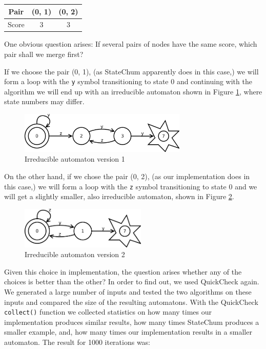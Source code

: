 \documentclass[]{sigplanconf}
\begin{document}
\begin{center}
\begin{tabular}{c||c|c}
Pair & (0, 1) & (0, 2)\\\hline\hline
Score & 3 & 3
\end{tabular}
\end{center}

One obvious question arises: If several pairs of nodes have the same score,
which pair shall we merge first?

If we choose the pair (0, 1), (as StateChum apparently does in this case,) we will
form a loop with the \texttt{y} symbol transitioning to state 0 and continuing with
the algorithm we will end up with an irreducible automaton shown in Figure \ref{fsm6}, where state 
numbers may differ.

\begin{figure}
\begin{center}
\includegraphics[width=8cm]{pictures/fsm6.pdf}
\end{center}
\caption{Irreducible automaton version 1}
\label{fsm6}
\end{figure}
 
On the other hand, if we chose the pair (0, 2), (as our implementation does in this
case,) we will form a loop with the \texttt{z} symbol transitioning to state 0 and
we will get a slightly smaller, also irreducible automaton, shown in Figure \ref{fsm7}.

\begin{figure}
\begin{center}
\includegraphics[width=6cm]{pictures/fsm7.pdf}
\end{center}
\caption{Irreducible automaton version 2}
\label{fsm7}
\end{figure}

Given this choice in implementation, the question arises whether any of the
choices is better than the other? In order to find out, we used QuickCheck again. 
We generated a large number of inputs
and tested the two algorithms on these inputs and compared the size of
the resulting automatons. With the QuickCheck \texttt{collect()} function we
collected statistics on how
many times our implementation produces similar results, how many times StateChum
produces a smaller example, and, how many
times our implementation results in a smaller automaton. The result for 1000
iterations was:
\end{document}
